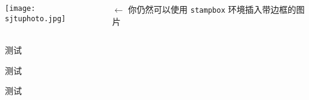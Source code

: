 \documentclass{ctexbeamer}
\begin{document}
\begin{frame}[fragile]
\begin{columns}
\begin{column}{0.45\textwidth}
        \begin{columns}[b]
          \begin{column}{.5\textwidth}
            \begin{stampbox}
              \texttt{[image: sjtuphoto.jpg]}
            \end{stampbox}
          \end{column}
          \begin{column}{.5\textwidth}
            $\leftarrow$ 你仍然可以使用 \texttt{stampbox} 环境插入带边框的图片\vspace{1ex}
          \end{column}
        \end{columns}
      \end{column}
    \end{columns}
  \end{frame}
  \title{}
  \author{}
  \logo{}
  \institute[]{}
  \begin{frame}
    \begin{columns}

    \begin{column}{.5\textwidth}
    \begin{stampblock}{测试}
      \zhlipsum[1]
    \end{stampblock}

    \begin{stampblock}{测试}
      \zhlipsum[2]
    \end{stampblock}

    \vspace*{0.5ex}

    \begin{stampblock}{测试}
      \zhlipsum[3]
    \end{stampblock}
  \end{column}

  \end{columns}
    
  \end{frame}
\end{document}
